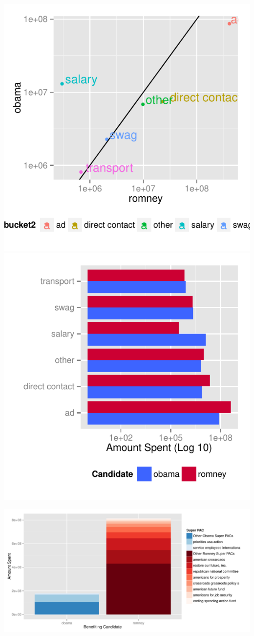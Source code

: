\documentclass[11pt]{article}\usepackage{graphicx, color}
\newenvironment{knitrout}{}{} %
\begin{document}
\begin{knitrout}
\color{fgcolor}\includegraphics[width=.4\textwidth]{figure/type_plot1} \includegraphics[width=.4\textwidth]{figure/type_plot2} 
\end{knitrout}

\begin{knitrout}
\color{fgcolor}

{\centering \includegraphics[width=\textwidth]{figure/PAC_plot} 

}


\end{knitrout}
\end{document}
